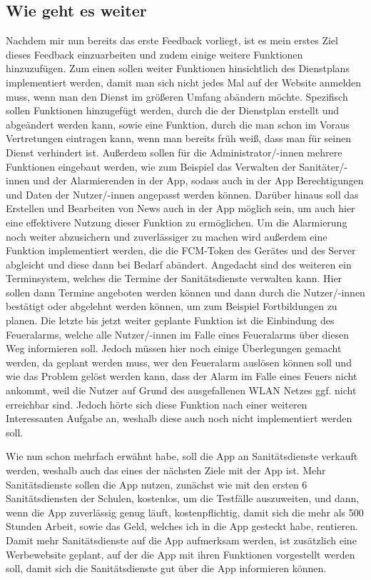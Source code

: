 \subsection{Wie geht es weiter}
Nachdem mir nun bereits das erste Feedback vorliegt, ist es mein erstes Ziel dieses Feedback einzuarbeiten und zudem einige weitere Funktionen
hinzuzufügen. Zum einen sollen weiter Funktionen hinsichtlich des Dienstplans implementiert werden, damit man sich nicht jedes Mal auf der
Website anmelden muss, wenn man den Dienst im größeren Umfang abändern möchte. Spezifisch sollen Funktionen hinzugefügt werden, durch die 
der Dienstplan erstellt und abgeändert werden kann, sowie eine Funktion, durch die man schon im Voraus Vertretungen eintragen kann, wenn man 
bereits früh weiß, dass man für seinen Dienst verhindert ist. Außerdem sollen für die Administrator/-innen mehrere Funktionen eingebaut werden, 
wie zum Beispiel das Verwalten der Sanitäter/-innen und der Alarmierenden in der App, sodass auch in der App Berechtigungen und Daten der 
Nutzer/-innen angepasst werden können. Darüber hinaus soll das Erstellen und Bearbeiten von News auch in der App möglich sein, um auch hier
eine effektivere Nutzung dieser Funktion zu ermöglichen. Um die Alarmierung noch weiter abzusichern und zuverlässiger zu machen wird außerdem eine
Funktion implementiert werden, die die FCM-Token des Gerätes und des Server abgleicht und diese dann bei Bedarf abändert.
Angedacht sind des weiteren ein Terminsystem, welches die Termine der Sanitätsdienste verwalten kann. Hier sollen dann Termine angeboten werden 
können und dann durch die Nutzer/-innen bestätigt oder abgelehnt werden können, um zum Beispiel Fortbildungen zu planen.
Die letzte bis jetzt weiter geplante Funktion ist die Einbindung des Feueralarms, welche alle Nutzer/-innen im Falle eines Feueralarms
über diesen Weg informieren soll. Jedoch müssen hier noch einige Überlegungen gemacht werden, da geplant werden muss, wer den Feueralarm
auslösen können soll und wie das Problem gelöst werden kann, dass der Alarm im Falle eines Feuers nicht ankommt, weil die Nutzer auf Grund 
des ausgefallenen WLAN Netzes ggf. nicht erreichbar sind.
Jedoch hörte sich diese Funktion nach einer weiteren Interessanten Aufgabe an, weshalb diese auch noch nicht implementiert werden soll.

Wie nun schon mehrfach erwähnt habe, soll die App an Sanitätsdienste verkauft werden, weshalb auch das eines der nächsten 
Ziele mit der App ist. Mehr Sanitätsdienste sollen die App nutzen, zunächst wie mit den ersten 6 Sanitätsdiensten der Schulen, kostenlos,
um die Testfälle auszuweiten, und dann, wenn die App zuverlässig genug läuft, kostenpflichtig, damit sich die mehr als 500 Stunden Arbeit, sowie 
das Geld, welches ich in die App gesteckt habe, rentieren. Damit mehr Sanitätsdienste auf die App aufmerksam werden, ist zusätzlich eine Werbewebsite
geplant, auf der die App mit ihren Funktionen vorgestellt werden soll, damit sich die Sanitätsdienste gut über die App informieren können.

